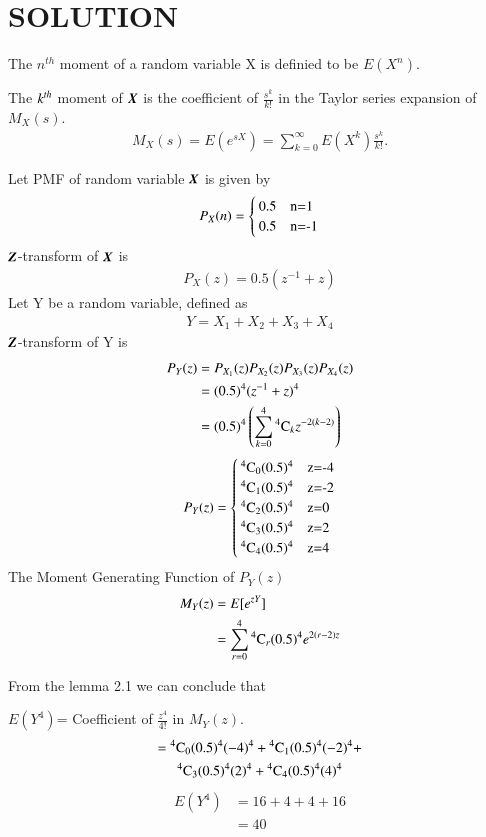 \documentclass[journal,12pt,twocolumn]{IEEEtran}
\begin{document}
\section{SOLUTION}
\begin{definition}
The $n^{th}$ moment of a random variable X is definied to be $E(X^{n})$.
\end{definition}
\begin{lemma}
The $\emph{k}^{th}$ moment of $\textbf{\emph{X}}$ is the coefficient of $\frac{s^{k}}{k!}$ in the Taylor series expansion of $M_{X}(s)$.
\begin{align}
    M_{X}(s)=E(e^{sX})=\sum_{k=0}^{\infty}E(X^{k})\frac{s^{k}}{k!}.
\end{align}
\end{lemma}
Let PMF of random variable $\textbf{\emph{X}}$ is given by
\begin{align}
P_{X}(n)=
\begin{cases}
0.5 & $n=1$\\
0.5 & $n=-1$
\end{cases}
\end{align}
$\textbf{\emph{Z}}$-transform of $\textbf{\emph{X}}$ is
\begin{align}
P_{X}(z)= 0.5(z^{-1}+z)
\end{align}
Let Y be a random variable, defined as
\begin{align}
    Y=X_{1}+X_{2}+X_{3}+X_{4}
\end{align}
$\textbf{\emph{Z}}$-transform of Y is 
\begin{align}
P_{Y}(z)
         &= P_{X_{1}}(z)P_{X_{2}}(z)P_{X_{3}}(z)P_{X_{4}}(z)\\
         &= (0.5)^{4}(z^{-1}+z)^{4}\\
         &= (0.5)^{4}\left(\sum_{k=0}^{4}{}^{4}\mathrm{C}_{k}z^{-2(k-2)} \right)
\end{align}
\begin{align}
    P_{Y}(z)=
    \begin{cases}
    \comb{4}{0}(0.5)^{4} & $z=-4$\\
    \comb{4}{1}(0.5)^{4} & $z=-2$\\
    \comb{4}{2}(0.5)^{4} & $z=0$\\
    \comb{4}{3}(0.5)^{4} & $z=2$\\
    \comb{4}{4}(0.5)^{4} & $z=4$
    \end{cases}
\end{align}
The Moment Generating Function of $P_{Y}(z)$ 
\begin{align}
    M_{Y}(z) &=E[e^{zY}]\\
             &= \sum_{r=0}^{4}{}^{4}\mathrm{C}_{r}(0.5)^{4}e^{2(r-2)z}\label{1}
\end{align}

From the lemma 2.1 we can conclude that

 $ E(Y^{4})$= Coefficient of $\frac{z^{4}}{4!}$ in $M_{Y}(z)$.
 \begin{multline}
   = {}^{4}\mathrm{C}_{0}(0.5)^{4}(-4)^{4}+{}^{4}\mathrm{C}_{1}(0.5)^{4}(-2)^{4}+\\ {}^{4}\mathrm{C}_{3}(0.5)^{4}(2)^{4}+ {}^{4}\mathrm{C}_{4} (0.5)^{4}(4)^{4}
 \end{multline} 
 \begin{align}
E(Y^{4})&=16+4+4+16\\
&=40
\end{align}
\end{document}
